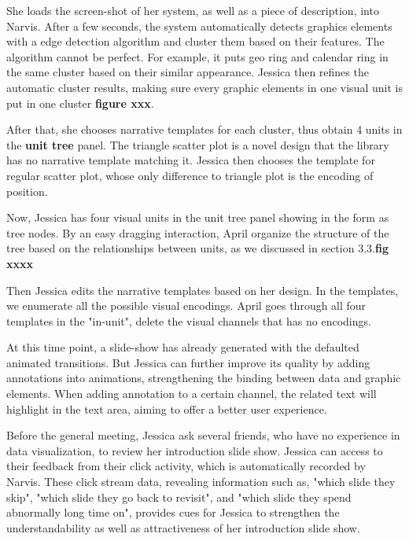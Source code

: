 She loads the screen-shot of her system, as well as a piece of description, into Narvis.
After a few seconds, the system automatically detects graphics elements with a edge detection algorithm and cluster them based on their features. The algorithm cannot be perfect. For example, it puts geo ring and calendar ring in the same cluster based on their similar appearance. 
Jessica then refines the automatic cluster results, making sure every graphic elements in one visual unit is put in one cluster \textbf{figure xxx}. 

After that, she chooses narrative templates for each cluster, thus obtain 4 units in the \textbf{unit tree} panel. The triangle scatter plot is a novel design that the library has no narrative template matching it. Jessica then chooses the template for regular scatter plot, whose only difference to triangle plot is the encoding of position. 

Now, Jessica has four visual units in the unit tree panel showing in the form as tree nodes. By an easy dragging interaction, April organize the structure of the tree based on the relationships between units, as we discussed in section 3.3.\textbf{fig xxxx}

Then Jessica edits the narrative templates based on her design. In the templates, we enumerate all the possible visual encodings. April goes through all four templates in the "in-unit", delete the visual channels that has no encodings. 

At this time point, a slide-show has already generated with the defaulted animated transitions. But Jessica can further improve its quality by adding annotations into animations, strengthening the binding between data and graphic elements. 
When adding annotation to a certain channel, the related text will highlight in the text area, aiming to offer a better user experience.   


Before the general meeting, Jessica ask several friends, who have no experience in data visualization, to review her introduction slide show. Jessica can access to their feedback from their click activity, which is automatically recorded by Narvis. These click stream data, revealing information such as, "which slide they skip", "which slide they go back to revisit", and "which slide they spend abnormally long time on", provides cues for Jessica to strengthen the understandability as well as attractiveness of her introduction slide show.  